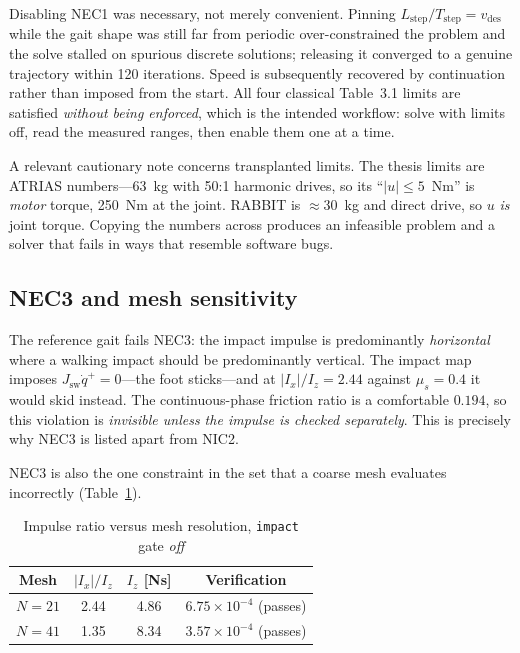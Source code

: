 \documentclass[10pt,conference]{IEEEtran}
\begin{document}
Disabling NEC1 was necessary, not merely convenient. Pinning
$L_{\mathrm{step}}/T_{\mathrm{step}} = v_{\mathrm{des}}$ while the gait shape was
still far from periodic over-constrained the problem and the solve stalled on
spurious discrete solutions; releasing it converged to a genuine trajectory
within 120 iterations. Speed is subsequently recovered by continuation rather
than imposed from the start. All four classical Table~3.1 limits are satisfied
\emph{without being enforced}, which is the intended workflow: solve with limits
off, read the measured ranges, then enable them one at a time.

A relevant cautionary note concerns transplanted limits. The thesis limits are
ATRIAS numbers---63~kg with 50:1 harmonic drives, so its ``$|u| \le 5$~Nm'' is
\emph{motor} torque, 250~Nm at the joint. RABBIT is ${\approx}30$~kg and direct
drive, so $u$ \emph{is} joint torque. Copying the numbers across produces an
infeasible problem and a solver that fails in ways that resemble software bugs.

\subsection{NEC3 and mesh sensitivity}
\label{sec:nec3}

The reference gait fails NEC3: the impact impulse is predominantly
\emph{horizontal} where a walking impact should be predominantly vertical. The
impact map imposes $J_{\mathrm{sw}}\dot q^+ = 0$---the foot sticks---and at
$|I_x|/I_z = 2.44$ against $\mu_s = 0.4$ it would skid instead. The
continuous-phase friction ratio is a comfortable $0.194$, so this violation is
\emph{invisible unless the impulse is checked separately}. This is precisely why
NEC3 is listed apart from NIC2.

NEC3 is also the one constraint in the set that a coarse mesh evaluates
incorrectly (Table~\ref{tab:nec3}).

\begin{table}[t]
\caption{Impulse ratio versus mesh resolution, \texttt{impact} gate \emph{off}}
\label{tab:nec3}
\centering
\begin{tabular}{cccc}
\toprule
Mesh & $|I_x|/I_z$ & $I_z$ [Ns] & Verification \\
\midrule
$N = 21$ & 2.44 & 4.86 & $6.75\times10^{-4}$ (passes) \\
$N = 41$ & 1.35 & 8.34 & $3.57\times10^{-4}$ (passes) \\
\bottomrule
\end{tabular}
\end{table}
\end{document}
